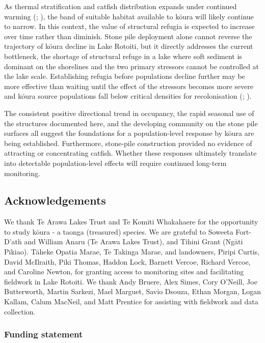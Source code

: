 \documentclass[
  letterpaper,
  DIV=11,
  numbers=noendperiod]{scrartcl}
\begin{document}
As thermal stratification and catfish distribution expands under
continued warming (;
), the band of suitable
habitat available to kōura will likely continue to narrow. In this
context, the value of structural refugia is expected to increase over
time rather than diminish. Stone pile deployment alone cannot reverse
the trajectory of kōura decline in Lake Rotoiti, but it directly
addresses the current bottleneck, the shortage of structural refuge in a
lake where soft sediment is dominant on the shorelines and the two
primary stressors cannot be controlled at the lake scale. Establishing
refugia before populations decline further may be more effective than
waiting until the effect of the stressors becomes more severe and kōura
source populations fall below critical densities for recolonisation
(;
).

The consistent positive directional trend in occupancy, the rapid
seasonal use of the structures documented here, and the developing
community on the stone pile surfaces all suggest the foundations for a
population-level response by kōura are being established. Furthermore,
stone-pile construction provided no evidence of attracting or
concentrating catfish. Whether these responses ultimately translate into
detectable population-level effects will require continued long-term
monitoring.

\subsection{Acknowledgements}\label{acknowledgements}

We thank Te Arawa Lakes Trust and Te Komiti Whakahaere for the
opportunity to study kōura - a taonga (treasured) species. We are
grateful to Soweeta Fort-D'ath and William Anaru (Te Arawa Lakes Trust),
and Tihini Grant (Ngāti Pikiao). Tāheke Opatia Marae, Te Takinga Marae,
and landowners, Piripi Curtis, David McIlraith, Piki Thomas, Haddon
Lock, Barnett Vercoe, Richard Vercoe, and Caroline Newton, for granting
access to monitoring sites and facilitating fieldwork in Lake Rotoiti.
We thank Andy Bruere, Alex Simes, Cory O'Neill, Joe Butterworth, Martin
Sarkezi, Mael Marguet, Savio Dsouza, Ethan Morgan, Logan Kallam, Calum
MacNeil, and Matt Prentice for assisting with fieldwork and data
collection.

\subsubsection{Funding statement}\label{funding-statement}
\end{document}
